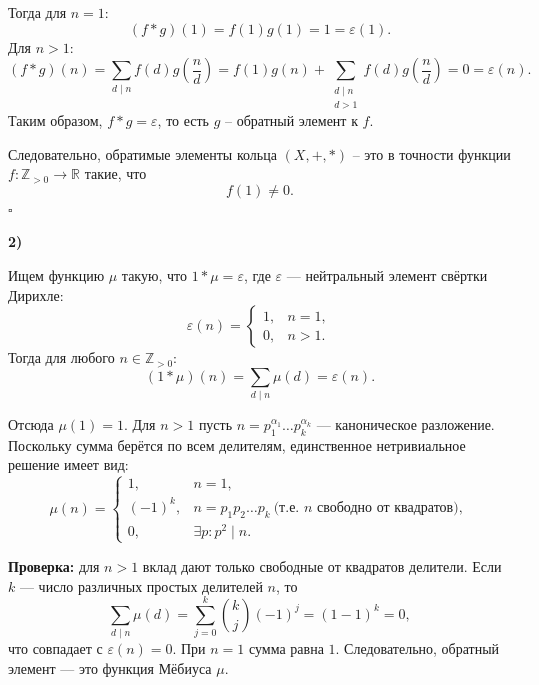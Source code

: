 \documentclass[12pt,a4paper]{article}
\newcommand{\soli}[1]{%
  \par\vspace{0.15\baselineskip}%
  \noindent\textbf{#1)}\ %
  \ignorespaces                     %
}
\begin{document}
Тогда для $n=1$:
\[
(f*g)(1)=f(1)g(1)=1=\varepsilon(1).
\]
Для $n>1$:
\[
(f*g)(n)=\sum_{d\mid n} f(d)g\!\left(\frac nd\right)
=f(1)g(n)+\sum_{\substack{d\mid n\\ d>1}} f(d)g\!\left(\frac nd\right)=0=\varepsilon(n).
\]
Таким образом, $f*g=\varepsilon$, то есть $g$ -- обратный элемент к $f$.

Следовательно, обратимые элементы кольца $(X,+,*)$ -- это в точности функции $f:\mathbb Z_{>0}\to\mathbb R$ такие, что
\[
f(1)\ne 0.
\]  \hfill $\square$


\soli{2}

Ищем функцию $\mu$ такую, что $1 * \mu = \varepsilon$, где $\varepsilon$ — нейтральный элемент свёртки Дирихле:
\[
\varepsilon(n) = 
\begin{cases}
1, & n = 1, \\
0, & n > 1.
\end{cases}
\]
Тогда для любого $n \in \mathbb{Z}_{>0}$:
\[
(1 * \mu)(n) = \sum_{d \mid n} \mu(d) = \varepsilon(n).
\]

Отсюда $\mu(1) = 1$. Для $n > 1$ пусть $n = p_1^{\alpha_1} \dots p_k^{\alpha_k}$ — каноническое разложение. Поскольку сумма берётся по всем делителям, единственное нетривиальное решение имеет вид:
\[
\mu(n) = 
\begin{cases}
1, & n = 1, \\
(-1)^k, & n = p_1 p_2 \dots p_k \ \text{(т.е. } n \text{ свободно от квадратов)}, \\
0, & \exists p : p^2 \mid n.
\end{cases}
\]

\textbf{Проверка:} для $n > 1$ вклад дают только свободные от квадратов делители. Если $k$ — число различных простых делителей $n$, то
\[
\sum_{d \mid n} \mu(d) = \sum_{j=0}^{k} \binom{k}{j} (-1)^j = (1 - 1)^k = 0,
\]
что совпадает с $\varepsilon(n) = 0$. При $n = 1$ сумма равна $1$. Следовательно, обратный элемент — это функция Мёбиуса $\mu$.

\newpage

\end{document}
